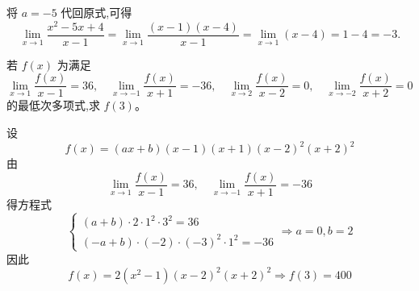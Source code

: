 \begin{questions}
\begin{solution}
将 $a=-5$ 代回原式,可得
\[
\lim_{x\to 1}\frac{x^2-5x+4}{x-1} = \lim_{x\to 1}\frac{(x-1)(x-4)}{x-1} = \lim_{x\to 1}(x-4) = 1-4=-3.
\]
\end{solution}
    \question 若 $f(x)$ 为满足
    \[
    \lim_{x\to 1} \frac{f(x)}{x-1} = 36, \quad 
    \lim_{x\to -1} \frac{f(x)}{x+1} = -36, \quad 
    \lim_{x\to 2} \frac{f(x)}{x-2} = 0, \quad 
    \lim_{x\to -2} \frac{f(x)}{x+2} = 0
    \]
    的最低次多项式,求 $f(3)$。
    \begin{solution}
        设
        \[
        f(x) = (ax+b)(x-1)(x+1)(x-2)^2(x+2)^2
        \]
        由
        \[
        \lim_{x\to 1} \frac{f(x)}{x-1} = 36, \quad \lim_{x\to -1} \frac{f(x)}{x+1} = -36
        \]
        得方程式
        \[
        \begin{cases}
        (a+b)\cdot 2 \cdot 1^2 \cdot 3^2 = 36 \\
        (-a+b)\cdot (-2) \cdot (-3)^2 \cdot 1^2 = -36 
        \end{cases} \Rightarrow a=0, b=2
        \]
        因此
        \[
        f(x) = 2(x^2-1)(x-2)^2(x+2)^2 \Rightarrow f(3)=400
        \]
    \end{solution}


\end{questions}
